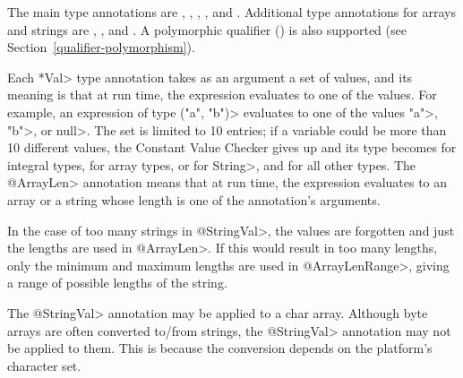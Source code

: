 The main type annotations are
,
,
,
, and
.
Additional type annotations for arrays and strings are
,
,
and .
A polymorphic qualifier ()
is also supported (see Section~\ref{qualifier-polymorphism}).

Each \<*Val> type annotation takes as an argument a set of values, and its
meaning is that at run time, the expression evaluates to one of the values.  For
example, an expression of type
\<("a", "b")> evaluates to
one of the values \<"a">, \<"b">, or \<null>.
The set is limited to 10 entries; if a variable
could be more than 10 different values, the Constant Value
Checker gives up and its type becomes
 for integral types,
 for array types,
 or  for \<String>, and
 for all other types.
The \<@ArrayLen> annotation means that at run time, the expression
evaluates to an array or a string whose length is one of the annotation's arguments.

In the case of too many strings in \<@StringVal>, the values are forgotten
and just the lengths are used in \<@ArrayLen>.
If this would result in too many lengths,
only the minimum and maximum lengths are used in \<@ArrayLenRange>,
giving a range of possible lengths of the string.

The \<@StringVal> annotation may be applied to a char array.  Although byte
arrays are often converted to/from strings, the \<@StringVal> annotation may
not be applied to them.  This is because the conversion depends on the
platform's character set.


